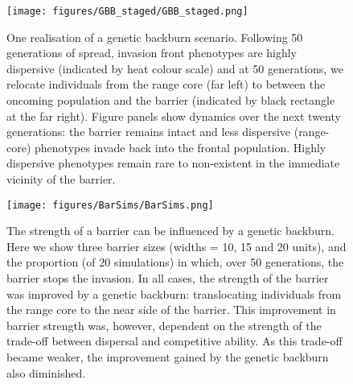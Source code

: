 \documentclass{article}
\begin{document}
\begin{figure}[h!]
\begin{center}
\texttt{[image: figures/GBB\_staged/GBB\_staged.png]}
\caption{\label{fig:stagedsims}
One realisation of a genetic backburn scenario.  Following 50 generations of spread, invasion front phenotypes are highly dispersive (indicated by heat colour scale) and at 50 generations, we relocate individuals from the range core (far left) to between the oncoming population and the barrier (indicated by black rectangle at the far right).  Figure panels show dynamics over the next twenty generations: the barrier remains intact and less dispersive (range-core) phenotypes invade back into the frontal population.  Highly dispersive phenotypes remain rare to non-existent in the immediate vicinity of the barrier.%
}
\end{center}
\end{figure}

\begin{figure}[h!]
\begin{center}
\texttt{[image: figures/BarSims/BarSims.png]}
\caption{\label{fig:barsims}
The strength of a barrier can be influenced by a genetic backburn.  Here we show three barrier sizes (widths = 10, 15 and 20 units), and the proportion (of 20 simulations) in which, over 50 generations, the barrier stops the invasion.  In all cases, the strength of the barrier was improved by a genetic backburn: translocating individuals from the range core to the near side of the barrier.  This improvement in barrier strength was, however, dependent on the strength of the trade-off between dispersal and competitive ability.  As this trade-off became weaker, the improvement gained by the genetic backburn also diminished.}
\end{center}
\end{figure}


    
  
\end{document}
